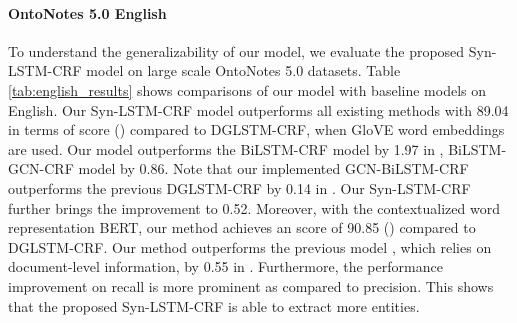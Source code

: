 \documentclass[11pt]{article}
\begin{document}
\paragraph{OntoNotes 5.0 English}
\label{sec:english}

To understand the generalizability of our model, we evaluate the proposed Syn-LSTM-CRF model on large scale OntoNotes 5.0 datasets. Table \ref{tab:english_results} shows comparisons of our model with baseline models on English. Our Syn-LSTM-CRF model outperforms all existing methods with 89.04 in terms of  score () compared to DGLSTM-CRF, when GloVE word embeddings are used. 
Our model outperforms the BiLSTM-CRF model by 1.97 in , BiLSTM-GCN-CRF \cite{Jie2019DependencyGuidedLF} model by 0.86. Note that our implemented GCN-BiLSTM-CRF outperforms the previous  DGLSTM-CRF \cite{Jie2019DependencyGuidedLF} by 0.14 in . 
Our Syn-LSTM-CRF further brings the improvement to 0.52.
Moreover, with the contextualized word representation BERT, our method achieves an  score of 90.85 () compared to DGLSTM-CRF. Our method outperforms the previous model \cite{Luo2019HierarchicalCR}, which relies on document-level information, by 0.55 in . Furthermore, the performance improvement on recall is more prominent as compared to precision. 
This shows that the proposed Syn-LSTM-CRF is able to extract more entities.
\end{document}
